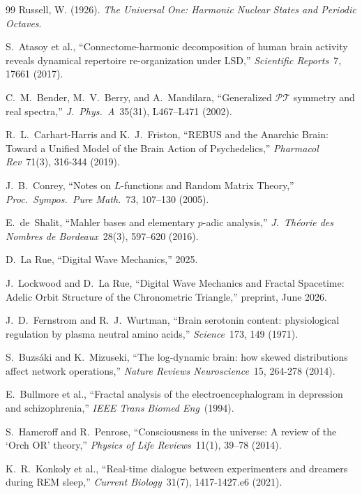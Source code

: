 \vspace{2em}
\begin{thebibliography}{99}
Russell, W. (1926).
\textit{The Universal One: Harmonic Nuclear States and Periodic Octaves}.

S.~Atasoy et al., ``Connectome-harmonic decomposition of human brain activity reveals dynamical repertoire re-organization under LSD,'' \emph{Scientific Reports}\ 7, 17661 (2017).

C.~M.~Bender, M.~V.~Berry, and A.~Mandilara, ``Generalized $\mathcal{PT}$ symmetry and real spectra,'' \emph{J.\ Phys.\ A}\ 35(31), L467--L471 (2002).

R.~L.~Carhart-Harris and K.~J.~Friston, ``REBUS and the Anarchic Brain: Toward a Unified Model of the Brain Action of Psychedelics,'' \emph{Pharmacol Rev}\ 71(3), 316-344 (2019).

J.~B.~Conrey, ``Notes on $L$-functions and Random Matrix Theory,'' \emph{Proc.\ Sympos.\ Pure Math.}\ 73, 107--130 (2005).

E.~de~Shalit, ``Mahler bases and elementary $p$-adic analysis,'' \emph{J.\ Th\'eorie des Nombres de Bordeaux}\ 28(3), 597--620 (2016).

D.~La Rue,
``Digital Wave Mechanics,'' 2025.

J.~Lockwood and D.~La Rue, ``Digital Wave Mechanics and Fractal Spacetime: Adelic Orbit Structure of the Chronometric Triangle,'' preprint, June 2026.

J.~D.~Fernstrom and R.~J.~Wurtman, ``Brain serotonin content: physiological regulation by plasma neutral amino acids,'' \emph{Science}\ 173, 149 (1971).

S.~Buzs\'aki and K.~Mizuseki, ``The log-dynamic brain: how skewed distributions affect network operations,'' \emph{Nature Reviews Neuroscience}\ 15, 264-278 (2014).

E.~Bullmore et al., ``Fractal analysis of the electroencephalogram in depression and schizophrenia,'' \emph{IEEE Trans Biomed Eng}\ (1994).

S.~Hameroff and R.~Penrose, ``Consciousness in the universe: A review of the `Orch OR' theory,'' \emph{Physics of Life Reviews}\ 11(1), 39--78 (2014).

K.~R.~Konkoly et al., ``Real-time dialogue between experimenters and dreamers during REM sleep,'' \emph{Current Biology}\ 31(7), 1417-1427.e6 (2021).


\end{thebibliography}
